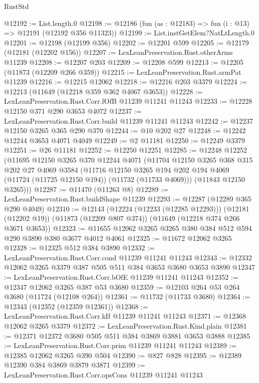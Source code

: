 \begin{lexlean}{RustStd}
\begin{coremodule}
@12192 := List.length.{0}
@12198 := @12186 (fun (as : @12183) => fun (i : @13) => @12191 (@12192 @356 @11323))
@12199 := List.instGetElem?NatLtLength.{0}
@12201 := @12198 (@12199 @356)
@12202 := @12201 @599
@12205 := @12179 (@12181 (@12202 @156))
@12207 := LexLeanPreservation.Rust.otherArms @11239
@12208 := @12207 @203
@12209 := @12208 @599
@12213 := @12205 (@11873 (@12209 @266 @359))
@12215 := LexLeanPreservation.Rust.armPat @11239
@12216 := @12215 @12062
@12218 := @12216 @203 @3379
@12224 := @12213 (@11649 (@12218 @359 @362 @4067 @3653))
@12228 := LexLeanPreservation.Rust.Corr.fOfB @11239 @11241 @11243
@12233 := @12228 @12150 @371 @290 @3653 @4072
@12237 := LexLeanPreservation.Rust.Corr.build @11239 @11241 @11243
@12242 := @12237 @12150 @3265 @365 @290 @370
@12244 := @10 @202 @27
@12248 := @12242 @12244 @3653 @4071 @4049
@12249 := @2 @11181
@12250 := @12249 @3379
@12251 := @26 @11181
@12252 := @12250 @12251
@12285 := @12248
    @12252
    (@11695
      @12150
      @3265
      @370
      @12244
      @4071
      (@11704
        @12150
        @3265
        @368
        @315
        @202
        @27
        @4069
        @3584
        (@11716
          @12150
          @3265
          @194
          @202
          @194
          @4069
          (@11724 (@11725 @12150 @194))
          (@11732 (@11733 @4069)))
        (@11843 @12150 @3265)))
@12287 := @11470 (@11263 @8)
@12289 := LexLeanPreservation.Rust.buildShape @11239
@12293 := @12287 (@12289 @365 @290 @4049)
@12310 := @12143
    (@12224 (@12233 (@12285 @12293)))
    (@12181 (@12202 @19))
    (@11873 (@12209 @807 @374))
    (@11649 (@12218 @374 @266 @3671 @3653))
@12323 := @11655 @12062 @3265 @3265 @380 @384 @512 @594 @290 @3890 @380 @3677 @4012 @4061
@12325 := @11672 @12062 @3265
@12328 := @12325 @512 @384 @3890
@12332 := LexLeanPreservation.Rust.Corr.cond @11239 @11241 @11243
@12343 := @12332 @12062 @3265 @3379 @387 @505 @511 @384 @3653 @3680 @3653 @3890
@12347 := LexLeanPreservation.Rust.Corr.bOfE @11239 @11241 @11243
@12352 := @12347 @12062 @3265 @387 @53 @3680
@12359 := @12103 @264 @53 @264 @3680 (@11724 (@12108 @264))
@12361 := @11732 (@11733 @3680)
@12364 := @12343 (@12352 (@12359 @12361))
@12368 := LexLeanPreservation.Rust.Corr.kIf @11239 @11241 @11243
@12371 := @12368 @12062 @3265 @3379
@12372 := LexLeanPreservation.Rust.Kind.plain
@12381 := @12371 @12372 @3680 @505 @511 @384 @3869 @3881 @3653 @3888
@12385 := LexLeanPreservation.Rust.Corr.prim @11239 @11241 @11243
@12389 := @12385 @12062 @3265 @390 @504
@12390 := @827 @828
@12395 := @12389 @12390 @384 @3869 @3879 @3871
@12399 := LexLeanPreservation.Rust.Corr.opsCons @11239 @11241 @11243

\end{coremodule}
\end{lexlean}
